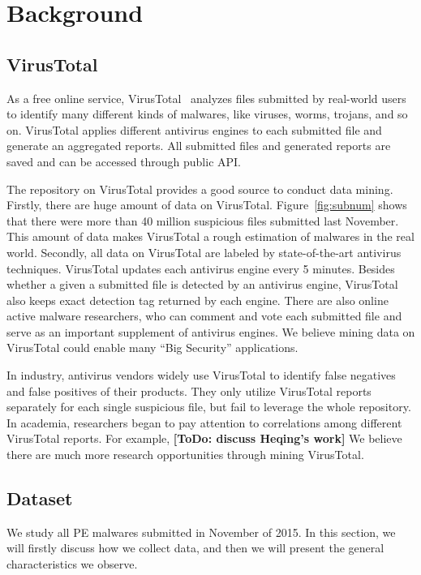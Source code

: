 \section{Background}

\subsection{VirusTotal}


As a free online service, VirusTotal~\cite{virustotal} analyzes files submitted by real-world users to identify many different kinds of malwares, 
like viruses, worms, trojans, and so on. 
VirusTotal applies different antivirus engines to each submitted file and generate an aggregated reports. 
All submitted files and generated reports are saved and can be accessed through public API. 

The repository on VirusTotal provides a good source to conduct data mining. 
Firstly, there are huge amount of data on VirusTotal.
Figure~\ref{fig:subnum} shows that there were more than 40 million suspicious files 
submitted last November. 
This amount of data makes VirusTotal a rough estimation of malwares in the real world. 
Secondly, all data on VirusTotal are labeled by state-of-the-art antivirus techniques. 
VirusTotal updates each antivirus engine every 5 minutes. 
Besides whether a given a submitted file is detected by an antivirus engine, VirusTotal also keeps exact detection tag returned by each engine. 
There are also online active malware researchers, 
who can comment and vote each submitted file and serve as an important supplement of antivirus engines. 
We believe mining data on VirusTotal could enable many ``Big Security'' applications. 

In industry, antivirus vendors widely use VirusTotal to identify false negatives and false positives of their products. 
They only utilize VirusTotal reports separately for each single suspicious file, but fail to leverage the whole repository. 
In academia, researchers began to pay attention to correlations among different VirusTotal reports. 
For example, {\bf [ToDo: discuss Heqing's work]}
We believe there are much more research opportunities through mining VirusTotal. 


\subsection{Dataset}
\label{sec:meth}


We study all PE malwares submitted in November of 2015. 
In this section, we will firstly discuss how we collect data, 
and then we will present the general characteristics we observe.

